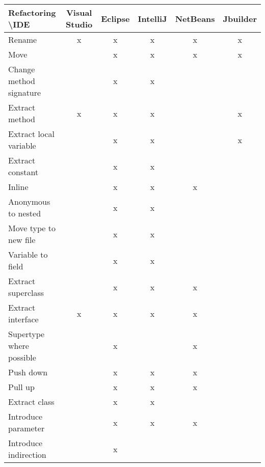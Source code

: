 \begin{table}[htbp]
\begin{tabular}{|l|c|c|c|c|c|}
\hline
Refactoring \textbackslash IDE           & Visual Studio & Eclipse & IntelliJ & NetBeans & Jbuilder \\ \hline
Rename                    & x             & x       & x        & x        & x        \\ \hline
Move                      &               & x       & x        & x        & x        \\ \hline
Change method signature   &               & x       & x        &          &          \\ \hline
Extract method            & x             & x       & x        &          & x        \\ \hline
Extract local variable    &               & x       & x        &          & x        \\ \hline
Extract constant          &               & x       & x        &          &          \\ \hline
Inline                    &               & x       & x        & x        &          \\ \hline
Anonymous to nested       &               & x       & x        &          &          \\ \hline
Move type to new file     &               & x       & x        &          &          \\ \hline
Variable to field         &               & x       & x        &          &          \\ \hline
Extract superclass        &               & x       & x        & x        &          \\ \hline
Extract interface         & x             & x       & x        & x        &          \\ \hline
Supertype where possible  &               & x       &          & x        &          \\ \hline
Push down                 &               & x       & x        & x        &          \\ \hline
Pull up                   &               & x       & x        & x        &          \\ \hline
Extract class             &               & x       & x        &          &          \\ \hline
Introduce parameter       &               & x       & x        & x        &          \\ \hline
Introduce indirection     &               & x       &          &          &          \\ \hline

\end{tabular}
\end{table}

